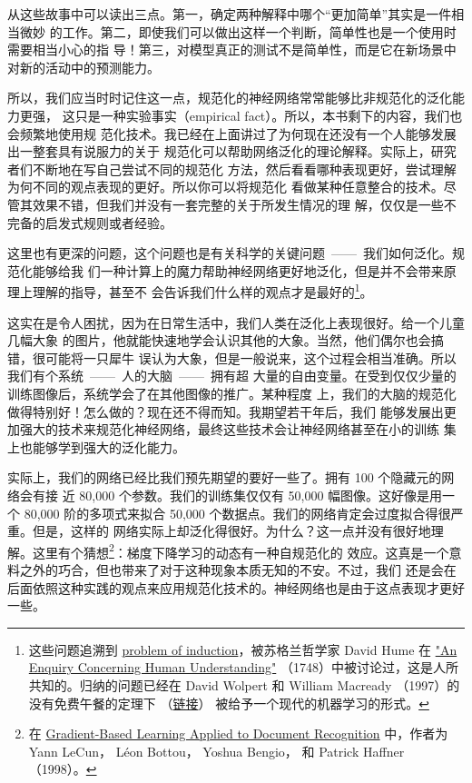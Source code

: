 从这些故事中可以读出三点。第一，确定两种解释中哪个“更加简单”其实是一件相当微妙
的工作。第二，即使我们可以做出这样一个判断，简单性也是一个使用时需要相当小心的指
导！第三，对模型真正的测试不是简单性，而是它在新场景中对新的活动中的预测能力。

所以，我们应当时时记住这一点，规范化的神经网络常常能够比非规范化的泛化能力更强，
这只是一种实验事实（empirical fact）。所以，本书剩下的内容，我们也会频繁地使用规
范化技术。我已经在上面讲过了为何现在还没有一个人能够发展出一整套具有说服力的关于
规范化可以帮助网络泛化的理论解释。实际上，研究者们不断地在写自己尝试不同的规范化
方法，然后看看哪种表现更好，尝试理解为何不同的观点表现的更好。所以你可以将规范化
看做某种任意整合的技术。尽管其效果不错，但我们并没有一套完整的关于所发生情况的理
解，仅仅是一些不完备的启发式规则或者经验。

这里也有更深的问题，这个问题也是有关科学的关键问题~——~我们如何泛化。规范化能够给我
们一种计算上的魔力帮助神经网络更好地泛化，但是并不会带来原理上理解的指导，甚至不
会告诉我们什么样的观点才是最好的\footnote{这些问题追溯到
  \href{http://en.wikipedia.org/wiki/Problem_of_induction}{problem of
    induction}，被苏格兰哲学家 David Hume 在
  \href{http://www.gutenberg.org/ebooks/9662}{"An Enquiry Concerning Human
    Understanding"} （1748）中被讨论过，这是人所共知的。归纳的问题已经在 David Wolpert 
		和 William Macready （1997）的没有免费午餐的定理下%
		（\href{http://ieeexplore.ieee.org/xpl/articleDetails.jsp?tp=&arnumber=585893}{链接}）%
		被给予一个现代的机器学习的形式。}。

这实在是令人困扰，因为在日常生活中，我们人类在泛化上表现很好。给一个儿童几幅大象
的图片，他就能快速地学会认识其他的大象。当然，他们偶尔也会搞错，很可能将一只犀牛
误认为大象，但是一般说来，这个过程会相当准确。所以我们有个系统~——~人的大脑~——~拥有超
大量的自由变量。在受到仅仅少量的训练图像后，系统学会了在其他图像的推广。某种程度
上，我们的大脑的规范化做得特别好！怎么做的？现在还不得而知。我期望若干年后，我们
能够发展出更加强大的技术来规范化神经网络，最终这些技术会让神经网络甚至在小的训练
集上也能够学到强大的泛化能力。

实际上，我们的网络已经比我们预先期望的要好一些了。拥有 100 个隐藏元的网络会有接
近 80,000 个参数。我们的训练集仅仅有 50,000 幅图像。这好像是用一个 80,000
阶的多项式来拟合 50,000 个数据点。我们的网络肯定会过度拟合得很严重。但是，这样的
网络实际上却泛化得很好。为什么？这一点并没有很好地理解。这里有个猜想\footnote{在
  \href{http://yann.lecun.com/exdb/publis/pdf/lecun-01a.pdf}{Gradient-Based
    Learning Applied to Document Recognition} 中，作者为 Yann LeCun， Léon Bottou，
  Yoshua Bengio， 和 Patrick Haffner （1998）。}：梯度下降学习的动态有一种自规范化的
效应。这真是一个意料之外的巧合，但也带来了对于这种现象本质无知的不安。不过，我们
还是会在后面依照这种实践的观点来应用规范化技术的。神经网络也是由于这点表现才更好
一些。

